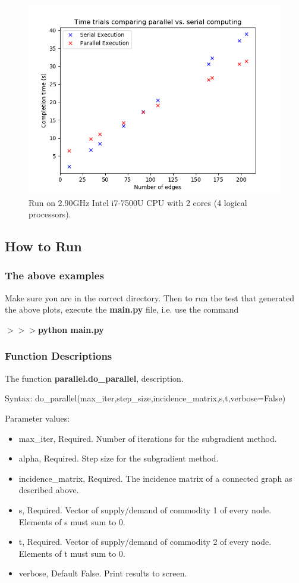 \documentclass[12pt]{article}
\begin{document}
\begin{figure}[H]
	\includegraphics[scale=1]{Problem3-TimeTrial.png}
	\caption{Run on 2.90GHz Intel i7-7500U CPU with 2 cores (4 logical processors).}
\end{figure}

\subsection*{How to Run}

\subsubsection*{The above examples}

Make sure you are in the correct directory. Then to run the test that generated the above plots, execute the \textbf{main.py} file, i.e. use the command

\noindent \textbf{$>>>$python main.py}

\subsubsection*{Function Descriptions}

The function \textbf{parallel.do\_parallel}, description.

Syntax: do\_parallel(max\_iter,step\_size,incidence\_matrix,s,t,verbose=False)

Parameter values:
\begin{itemize}
	\item max\_iter, Required. Number of iterations for the subgradient method.
	\item alpha, Required. Step size for the subgradient method.
	\item incidence\_matrix, Required. The incidence matrix of a connected graph as described above.
	\item s, Required. Vector of supply/demand of commodity 1 of every node. Elements of s must sum to 0.
	\item t, Required. Vector of supply/demand of commodity 2 of every node. Elements of t must sum to 0.
	\item verbose, Default False. Print results to screen.
\end{itemize}
\end{document}
